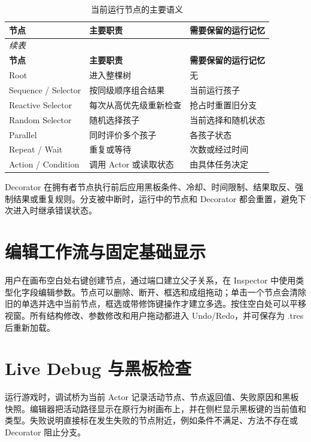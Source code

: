 \documentclass[11pt,a4paper,oneside,extrafontsizes]{memoir}
\begin{document}
\begin{center}

\begin{longtable}{@{}p{} p{} p{}@{}}
\caption{当前运行节点的主要语义}\label{tab:runtime-node-semantics}\\
\toprule
\textbf{节点} & \textbf{主要职责} & \textbf{需要保留的运行记忆} \\
\midrule
\endfirsthead
\multicolumn{3}{l}{\itshape 续表}\\
\toprule
\textbf{节点} & \textbf{主要职责} & \textbf{需要保留的运行记忆} \\
\midrule
\endhead
Root & 进入整棵树 & 无 \\
Sequence / Selector & 按同级顺序组合结果 & 当前运行孩子 \\
Reactive Selector & 每次从高优先级重新检查 & 抢占时重置旧分支 \\
Random Selector & 随机选择孩子 & 当前选择和随机状态 \\
Parallel & 同时评价多个孩子 & 各孩子状态 \\
Repeat / Wait & 重复或等待 & 次数或经过时间 \\
Action / Condition & 调用 Actor 或读取状态 & 由具体任务决定 \\
\bottomrule
\end{longtable}
\end{center}

Decorator 在拥有者节点执行前后应用黑板条件、冷却、时间限制、结果取反、强制结果或重复规则。分支被中断时，运行中的节点和 Decorator 都会重置，避免下次进入时继承错误状态。

\section{编辑工作流与固定基础显示}

用户在画布空白处右键创建节点，通过端口建立父子关系，在 Inspector 中使用类型化字段编辑参数。节点可以删除、断开、框选和成组拖动；单击一个节点会清除旧的单选并选中当前节点，框选或带修饰键操作才建立多选。按住空白处可以平移视窗。所有结构修改、参数修改和用户拖动都进入 Undo/Redo，并可保存为 .tres 后重新加载。

\section{Live Debug 与黑板检查}

运行游戏时，调试桥为当前 Actor 记录活动节点、节点返回值、失败原因和黑板快照。编辑器把活动路径显示在原行为树画布上，并在侧栏显示黑板键的当前值和类型。失败说明直接标在发生失败的节点附近，例如条件不满足、方法不存在或 Decorator 阻止分支。
\end{document}
